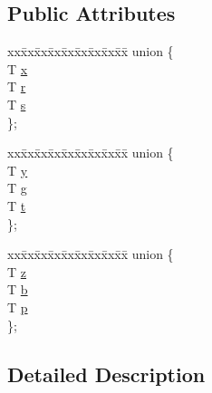 \subsection*{Public Attributes}
\begin{DoxyCompactItemize}
\item 
\begin{tabbing}
xx\=xx\=xx\=xx\=xx\=xx\=xx\=xx\=xx\=\kill
union \{\\
\>T \hyperlink{structglm_1_1detail_1_1tvec3_a9c7bc0ecd949a50b911cda1800c4a9c6}{x}\\
\>T \hyperlink{structglm_1_1detail_1_1tvec3_ac31894f162d510226b171f84693ac6f6}{r}\\
\>T \hyperlink{structglm_1_1detail_1_1tvec3_aa7906d8cd1a54c96ba22c1f97ebaf7cc}{s}\\
\}; \\

\end{tabbing}\item 
\begin{tabbing}
xx\=xx\=xx\=xx\=xx\=xx\=xx\=xx\=xx\=\kill
union \{\\
\>T \hyperlink{structglm_1_1detail_1_1tvec3_a3de16793bf75ea1e959c3d044709ded7}{y}\\
\>T \hyperlink{structglm_1_1detail_1_1tvec3_aa3cc26bd8e04e78a956df5955e22620d}{g}\\
\>T \hyperlink{structglm_1_1detail_1_1tvec3_a9d0e9fe332bb2d7f4bdd427193dec825}{t}\\
\}; \\

\end{tabbing}\item 
\begin{tabbing}
xx\=xx\=xx\=xx\=xx\=xx\=xx\=xx\=xx\=\kill
union \{\\
\>T \hyperlink{structglm_1_1detail_1_1tvec3_a9996ce4dc16af21710bd1f7102fa66a7}{z}\\
\>T \hyperlink{structglm_1_1detail_1_1tvec3_a0b52d699c6157d0e61d841f9171f086e}{b}\\
\>T \hyperlink{structglm_1_1detail_1_1tvec3_a9497f386cf253b5e7fef650b8348fc2f}{p}\\
\}; \\

\end{tabbing}\end{DoxyCompactItemize}


\subsection{Detailed Description}
